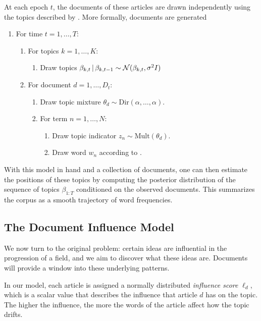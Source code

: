 At each epoch $t$, the documents of these articles are drawn independently
using the topics described by .  More formally, documents
are generated
\begin{enumerate}
\item For time $t=1, \ldots, T$:
  \begin{enumerate}
  \item For topics $k=1, \ldots, K$:
    \begin{enumerate}
    \item Draw topics $\beta_{k,t} \, | \, \beta_{k,t-1} \sim \mathcal{N}(\beta_{k,t}, \sigma^2 I)$
    \end{enumerate}
  \item For document $d=1, \ldots, D_t$:
    \begin{enumerate}
    \item Draw topic mixture $\theta_d \sim \mbox{Dir}(\alpha, \ldots, \alpha)$.
    \item For term $n=1, \ldots, N$:
      \begin{enumerate}
      \item Draw topic indicator $z_n \sim \mbox{Mult}(\theta_d)$.
      \item Draw word $w_n$ according to .
      \end{enumerate}
    \end{enumerate}
  \end{enumerate}
\end{enumerate}

With this model in hand and a collection of documents, one can then
estimate the positions of these topics by computing the posterior
distribution of the sequence of topics $\beta_{1:T}$ conditioned on
the observed documents.  This summarizes the corpus as a smooth
trajectory of word frequencies.

\subsection*{The Document Influence Model}
We now turn to the original problem: certain ideas are influential in
the progression of a field, and we aim to discover what these ideas
are. Documents will provide a window into these underlying patterns.

In our model, each article is assigned a normally distributed
\textit{influence score} $\ell_d$, which is a scalar value that
describes the influence that article $d$ has on the topic.  The higher
the influence, the more the words of the article affect how the topic
drifts.

